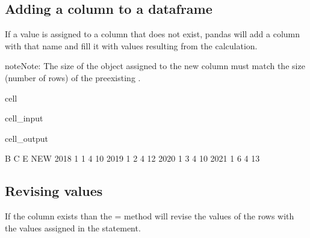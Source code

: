 \documentclass[letterpaper,10pt,english]{jupyterBook}
\begin{document}
\subsection{Adding a column to a dataframe}
\label{\detokenize{content/04_PythonEssentials/PythonPandasDataframes:adding-a-column-to-a-dataframe}}
\sphinxAtStartPar
If a value is assigned to a column that does not exist, pandas will add a column with that name and fill it with values resulting from  the calculation.

\begin{sphinxadmonition}{note}{Note:}
\sphinxAtStartPar
The size of the object assigned to the new column must match the size (number of rows) of the pre\sphinxhyphen{}existing .
\end{sphinxadmonition}

\begin{sphinxuseclass}{cell}\begin{sphinxVerbatimInput}

\begin{sphinxuseclass}{cell_input}
\begin{sphinxVerbatim}[commandchars=\\\{\}]
\PYG{p}{[}\PYG{p}{]}\PYG{p}{[}\PYG{p}{]}
\end{sphinxVerbatim}

\end{sphinxuseclass}\end{sphinxVerbatimInput}
\begin{sphinxVerbatimOutput}

\begin{sphinxuseclass}{cell_output}
\begin{sphinxVerbatim}[commandchars=\\\{\}]
      B  C  E  NEW
2018  1  1  4   10
2019  1  2  4   12
2020  1  3  4   10
2021  1  6  4   13
\end{sphinxVerbatim}

\end{sphinxuseclass}\end{sphinxVerbatimOutput}

\end{sphinxuseclass}

\subsection{Revising values}
\label{\detokenize{content/04_PythonEssentials/PythonPandasDataframes:revising-values}}
\sphinxAtStartPar
If the column exists than the = method will revise the values of the rows with the values assigned in the statement.
\end{document}
